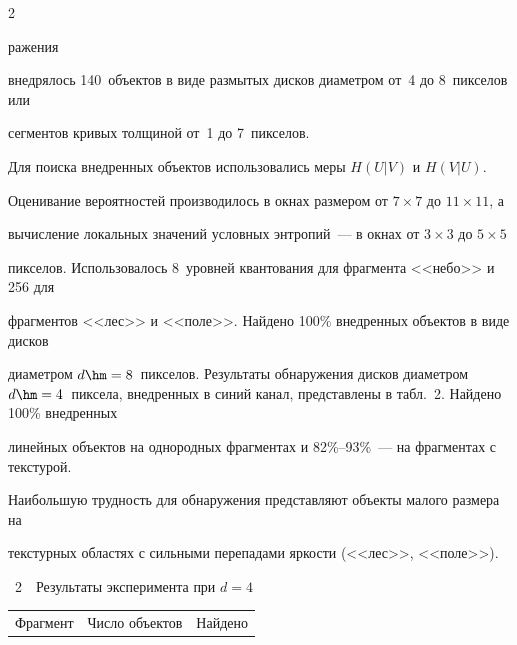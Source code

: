 \begin{multicols}{2}
\pagebreak





\noindent


ражения 


внедрялось 140~объектов в виде размытых дисков диаметром от~4 до 8~пикселов или 


сегментов кривых толщиной от~1 до 7~пикселов. 


  


  Для поиска внедренных объектов использовались меры $H(U\vert V)$ и $H(V\vert U)$. 


Оценивание вероятностей производилось в окнах размером от $7\times 7$ до $11\times 11$, а 


вычисление локальных значений условных энтропий~--- в окнах от $3\times 3$ до $5\times 5$ 


пикселов. Использовалось 8~уровней квантования для фрагмента <<небо>> и 256 для 


фрагментов <<лес>> и <<поле>>. Найдено 100\% внедренных объектов в виде дисков 


диаметром $d \hm= 8$~пикселов. Результаты обнаружения дисков диаметром $d\hm = 


4$~пиксела, внедренных в синий канал, представлены в табл.~2. Найдено 100\% внедренных 


линейных объектов на однородных фрагментах и 82\%--93\%~--- на фрагментах с текстурой. 


Наибольшую трудность для обнаружения представляют объекты малого размера на 


текстурных областях с сильными перепадами яркости (<<лес>>, <<поле>>).





\begin{center} %


{{\tablename~2}\ \ \small{Результаты эксперимента при $d = 4$}}


\vspace*{9pt}





{\small 


\begin{tabular}{|l|c|c|c|}


\hline


\multicolumn{1}{|c|}{Фрагмент}&Число объектов&\multicolumn{2}{c|}{Найдено}\\



\end{tabular}}
\end{center}
\end{multicols}
